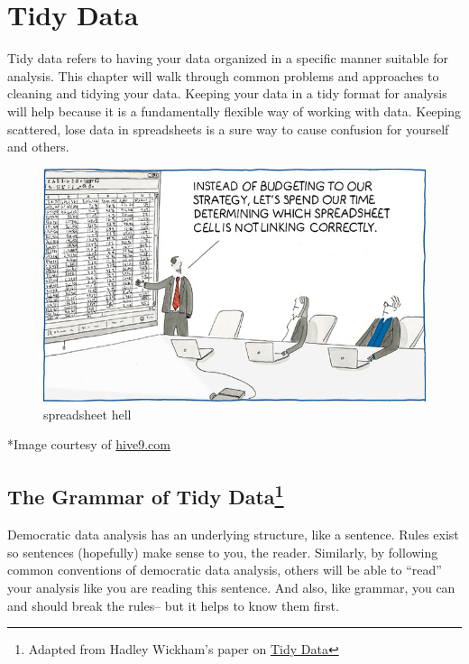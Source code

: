 \documentclass[
]{book}
\begin{document}
\hypertarget{tidy-data}{%
\chapter{Tidy Data}\label{tidy-data}}

Tidy data refers to having your data organized in a specific manner suitable for analysis. This chapter will walk through common problems and approaches to cleaning and tidying your data. Keeping your data in a tidy format for analysis will help because it is a fundamentally flexible way of working with data. Keeping scattered, lose data in spreadsheets is a sure way to cause confusion for yourself and others.

\begin{figure}
\centering
\includegraphics{images/spreadsheet_hell.png}
\caption{spreadsheet hell}
\end{figure}

*Image courtesy of \href{https://www.hive9.com/blog/just-say-no-to-spreadsheets}{hive9.com}

\hypertarget{the-grammar-of-tidy-data}{%
\section[The Grammar of Tidy Data]{\texorpdfstring{The Grammar of Tidy Data\footnote{Adapted from Hadley Wickham's paper on \href{https://vita.had.co.nz/papers/tidy-data.pdf}{Tidy Data}}}{The Grammar of Tidy Data}}\label{the-grammar-of-tidy-data}}

Democratic data analysis has an underlying structure, like a sentence. Rules exist so sentences (hopefully) make sense to you, the reader. Similarly, by following common conventions of democratic data analysis, others will be able to ``read'' your analysis like you are reading this sentence. And also, like grammar, you can and should break the rules-- but it helps to know them first.
\end{document}
